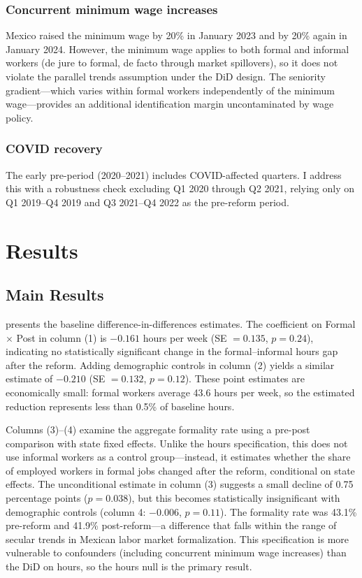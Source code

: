 \documentclass[12pt]{article}
\begin{document}
\subsubsection*{Concurrent minimum wage increases} Mexico raised the minimum wage by 20\% in January 2023 and by 20\% again in January 2024. However, the minimum wage applies to both formal and informal workers (de jure to formal, de facto through market spillovers), so it does not violate the parallel trends assumption under the DiD design. The seniority gradient---which varies within formal workers independently of the minimum wage---provides an additional identification margin uncontaminated by wage policy.

\subsubsection*{COVID recovery} The early pre-period (2020--2021) includes COVID-affected quarters. I address this with a robustness check excluding Q1 2020 through Q2 2021, relying only on Q1 2019--Q4 2019 and Q3 2021--Q4 2022 as the pre-reform period.

\section{Results}

\subsection{Main Results}

 presents the baseline difference-in-differences estimates. The coefficient on Formal $\times$ Post in column (1) is $-0.161$ hours per week (SE $= 0.135$, $p = 0.24$), indicating no statistically significant change in the formal--informal hours gap after the reform. Adding demographic controls in column (2) yields a similar estimate of $-0.210$ (SE $= 0.132$, $p = 0.12$). These point estimates are economically small: formal workers average 43.6 hours per week, so the estimated reduction represents less than 0.5\% of baseline hours.

Columns (3)--(4) examine the aggregate formality rate using a pre-post comparison with state fixed effects. Unlike the hours specification, this does not use informal workers as a control group---instead, it estimates whether the share of employed workers in formal jobs changed after the reform, conditional on state effects. The unconditional estimate in column (3) suggests a small decline of 0.75 percentage points ($p = 0.038$), but this becomes statistically insignificant with demographic controls (column 4: $-0.006$, $p = 0.11$). The formality rate was 43.1\% pre-reform and 41.9\% post-reform---a difference that falls within the range of secular trends in Mexican labor market formalization. This specification is more vulnerable to confounders (including concurrent minimum wage increases) than the DiD on hours, so the hours null is the primary result.
\end{document}
